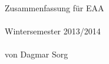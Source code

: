 \begin{titlepage}
	\phantom{text}\vfill
	\begin{center}
		\Huge{Zusammenfassung für EAA}\\\ \\
		\Large{Wintersemester 2013/2014}\\\ \\
		\large{von Dagmar Sorg}
	\end{center}
	\vfill	\phantom{text}
	\end{titlepage}